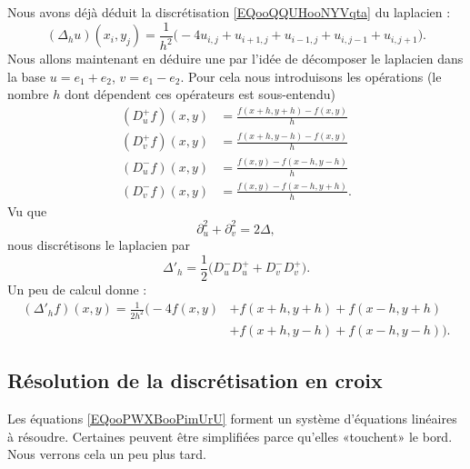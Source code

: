 Nous avons déjà déduit la discrétisation \eqref{EQooQQUHooNYVqta} du laplacien :
\begin{equation}    
    (\Delta_hu)(x_i,y_j)=\frac{1}{ h^2 }\big( -4u_{i,j}+u_{i+1,j}+u_{i-1,j}+u_{i,j-1}+u_{i,j+1} \big).
\end{equation}
Nous allons maintenant en déduire une par l'idée de décomposer le laplacien dans la base \( u=e_1+e_2\), \( v=e_1-e_2\). Pour cela nous introduisons les opérations (le nombre \( h\) dont dépendent ces opérateurs est sous-entendu)
\begin{subequations}
    \begin{align}
        (D^+_uf)(x,y)&=\frac{ f(x+h,y+h)-f(x,y) }{ h }\\
        (D^+_vf)(x,y)&=\frac{ f(x+h,y-h)-f(x,y) }{ h }\\
        (D^-_uf)(x,y)&=\frac{ f(x,y)-f(x-h,y-h) }{ h }\\
        (D^-_vf)(x,y)&=\frac{ f(x,y)-f(x-h,y+h) }{ h }.
    \end{align}
\end{subequations}
Vu que 
\begin{equation}
    \partial_u^2+\partial_v^2=2\Delta,
\end{equation}
nous discrétisons le laplacien par
\begin{equation}
    \Delta'_h=\frac{ 1 }{2}\big( D_u^-D_u^++D_v^-D_v^+ \big).
\end{equation}
Un peu de calcul donne :
\begin{subequations}   \label{EQooLHBDooSBFkho}
    \begin{align}
    (\Delta'_hf)(x,y)=\frac{1}{ 2h^2 }\Big( -4f(x,y)&+f(x+h,y+h)+f(x-h,y+h)\\
    &+f(x+h,y-h)+f(x-h,y-h) \Big).
    \end{align}
\end{subequations}

\subsection{Résolution de la discrétisation en croix}

Les équations \eqref{EQooPWXBooPimUrU} forment un système d'équations linéaires à résoudre. Certaines peuvent être simplifiées parce qu'elles «touchent» le bord. Nous verrons cela un peu plus tard.

